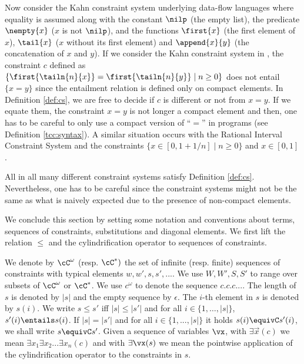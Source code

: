 \documentclass{tlp}
\begin{document}
Now consider the Kahn constraint system underlying data-flow languages where equality is assumed along with the constant $\nilp$ (the empty list), the predicate $\nempty{x}$ ($x$ is not  $\nilp$),  and the functions $\first{x}$ (the first element of $x$), $\tail{x}$ ($x$ without its first element) and $\append{x}{y}$ (the concatenation of $x$ and $y$). If we consider the Kahn constraint system in \cite{SRP91},  the constraint $c$ defined as $\{\first{\tailn{n}{x}} = \first{\tailn{n}{y}} \mid n\geq 0\}$ does not entail   $\{x=y\}$   since the entailment relation is defined only on compact elements. In Definition \ref{def:cs}, we are free to decide if $c$ is different or not from $x=y$. If we equate them, the constraint $x=y$ is not longer a compact element and then, one has to be careful to only use a compact version of ``$=$'' in programs (see Definition \ref{tcc:syntax}). A similar situation occurs with the  Rational Interval Constraint System \cite{SRP91} and the constraints  $ \{ x \in [0, 1 + 1/n]  \mid n \geq 0 \}$  and  $x \in [0,1]$. 

All in all many different constraint systems satisfy Definition \ref{def:cs}. Nevertheless, one has to be careful since the constraint systems might not be the same as what is naively expected due to the presence of non-compact elements.

We conclude this section by setting some notation and conventions
about terms, sequences of constraints, substitutions and diagonal
elements. We first lift the relation $\leq$ and the cylindrification
operator to sequences of constraints.

\begin{notation}\label{not:seq-constraints}
We denote  by  $\cC^\omega$ (resp. $\cC^*)$ the set of infinite (resp. finite) sequences of constraints with typical elements $w,w',s,s',...$. We
use $W,W',S,S'$ to range over subsets of $\cC^\omega$ or $\cC^*$. 
We use $c^\omega$ to denote the sequence $c.c.c...$.  The length of
$s$ is denoted by $|s|$ and the  empty sequence by $\epsilon$. The
$i$-th element in $s$ is denoted by $s(i)$. 
 We write $s\leq s'$ iff $|s| \leq |s'|$ and for all $i \in \{1,
\ldots, |s|\}$, $s'(i) \entails s(i)$. If  $|s| = |s'|$ and for all
$i \in \{1,..., |s|\}$ it holds $s(i) \equivC s'(i)$, we shall write
$s \equivC s'$. Given a sequence of variables $\vx$, with  $\exists \vec{x}(c)$ we mean  $\exists x_1\exists x_2
...\exists x_n (c) $ and 
 with $\exists \vx(s)$ we mean the pointwise application of the
cylindrification operator to the constraints in $s$. 
 \end{notation}
 
\end{document}
